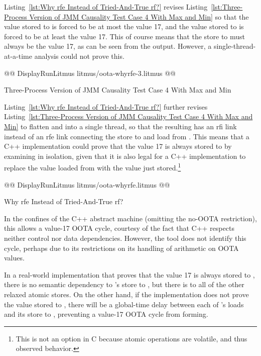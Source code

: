 \documentclass[10]{article}
\begin{document}
Listing~\ref{lst:Why rfe Instead of Tried-And-True rf?}
revises
Listing~\ref{lst:Three-Process Version of JMM Causality Test Case 4 With Max and Min}
so that the value stored to  is forced to be at most the
value 17, and the value stored to  is forced to be at least the
value 17.
This of course means that the store to  must always be the value
17, as can be seen from the  output.
However, a single-thread-at-a-time analysis could not prove this.

\begin{listing}[tbp]
@@ DisplayRunLitmus litmus/oota-whyrfe-3.litmus @@
\caption{Three-Process Version of JMM Causality Test Case 4 With Max and Min}
\label{lst:Three-Process Version of JMM Causality Test Case 4 With Max and Min}
\end{listing}

Listing~\ref{lst:Why rfe Instead of Tried-And-True rf?}
further revises
Listing~\ref{lst:Three-Process Version of JMM Causality Test Case 4 With Max and Min}
to flatten  and  into a single thread, so that the
resulting  has an rfi link instead of an rfe link connecting
the store to and load from .
This means that a C++ implementation could prove that the value 17 is
always stored to  by examining  in isolation, given that
it is also legal for a C++ implementation to replace the value loaded
from  with the value just stored.\footnote{
	This is not an option in C because atomic operations are volatile,
	and thus observed behavior.}

\begin{listing}[tbp]
@@ DisplayRunLitmus litmus/oota-whyrfe.litmus @@
\caption{Why rfe Instead of Tried-And-True rf?}
\label{lst:Why rfe Instead of Tried-And-True rf?}
\end{listing}

In the confines of the C++ abstract machine (omitting the no-OOTA
restriction), this allows a value-17 OOTA cycle, courtesy of the fact
that C++ respects neither control nor data dependencies.
However, the  tool does not identify this cycle, perhaps due
to its restrictions on its handling of arithmetic on OOTA values.

In a real-world implementation that proves that the value 17 is always
stored to , there is no semantic dependency to
's store to , but there is to all of the other relaxed
atomic stores.
On the other hand, if the implementation does not prove the value
stored to , there will be a global-time delay between each of
's loads and its store to , preventing a value-17 OOTA
cycle from forming.
\end{document}
